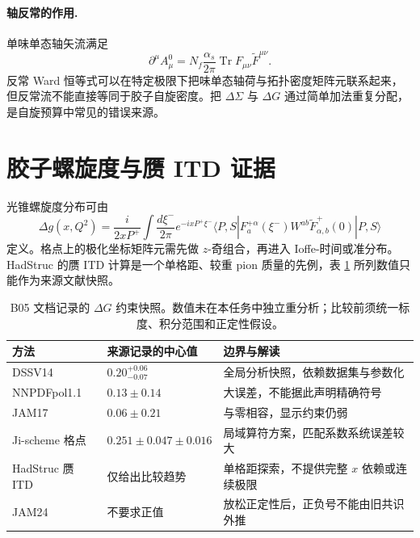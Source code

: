 \paragraph{轴反常的作用.}
单味单态轴矢流满足
\begin{equation}
  \partial^\mu A_\mu^0
  =N_f\frac{\alpha_s}{2\pi}\operatorname{Tr}F_{\mu\nu}\widetilde F^{\mu\nu}.
  \label{eq:b05-axial-anomaly}
\end{equation}
反常 Ward 恒等式可以在特定极限下把味单态轴荷与拓扑密度矩阵元联系起来，但反常流不能直接等同于胶子自旋密度。把 \(\Delta\Sigma\) 与 \(\Delta G\) 通过简单加法重复分配，是自旋预算中常见的错误来源。

\section{胶子螺旋度与赝 ITD 证据}

光锥螺旋度分布可由
\begin{equation}
  \Delta g(x,Q^2)
  =\frac{i}{2xP^+}\int\frac{d\xi^-}{2\pi}
    e^{-ixP^+\xi^-}
    \langle P,S|F_a^{+\alpha}(\xi^-)W^{ab}\widetilde F^+_{\alpha,b}(0)|P,S\rangle
  \label{eq:b05-helicity-pdf}
\end{equation}
定义。格点上的极化坐标矩阵元需先做 \(z\)-奇组合，再进入 Ioffe-时间或准分布。HadStruc 的赝 ITD 计算是一个单格距、较重 pion 质量的先例，表 \ref{tab:b05-spin-constraints} 所列数值只能作为来源文献快照。

\begin{table}[H]
  \centering
  \caption{B05 文档记录的 \(\Delta G\) 约束快照。数值未在本任务中独立重分析；比较前须统一标度、积分范围和正定性假设。}
  \label{tab:b05-spin-constraints}
  \small
  \begin{tabularx}{\textwidth}{@{}p{}p{}X@{}}
    \toprule
    方法 & 来源记录的中心值 & 边界与解读 \\
    \midrule
    DSSV14 & \(0.20^{+0.06}_{-0.07}\) & 全局分析快照，依赖数据集与参数化 \\
    NNPDFpol1.1 & \(0.13\pm0.14\) & 大误差，不能据此声明精确符号 \\
    JAM17 & \(0.06\pm0.21\) & 与零相容，显示约束仍弱 \\
    Ji-scheme 格点 & \(0.251\pm0.047\pm0.016\) & 局域算符方案，匹配系数系统误差较大 \\
    HadStruc 赝 ITD & 仅给出比较趋势 & 单格距探索，不提供完整 \(x\) 依赖或连续极限 \\
    JAM24 & 不要求正值 & 放松正定性后，正负号不能由旧共识外推 \\
    \bottomrule
  \end{tabularx}
\end{table}

